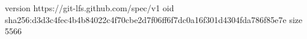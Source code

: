 version https://git-lfs.github.com/spec/v1
oid sha256:d3d3c4fec4b4b84022c4f70cbe2d7f06ff6f7dc0a16f301d4304fda786f85e7e
size 5566
